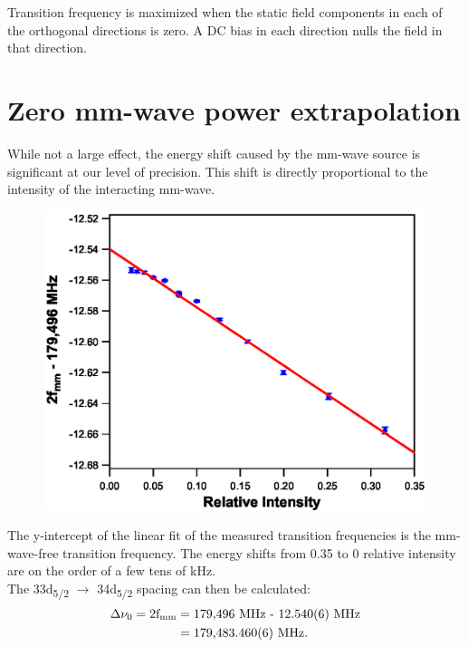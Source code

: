 \documentclass[landscape]{sciposter}
\begin{document}
\begin{multicols}{4}
Transition frequency is maximized when the static field components in each of the orthogonal directions is zero. A DC bias in each direction nulls the field in that direction. 

\section*{\large Zero mm-wave power extrapolation}
While not a large effect, the energy shift caused by the mm-wave source is significant at our level of precision. This shift is directly proportional to the intensity of the interacting mm-wave. 

\begin{figure}
\begin{center}
\includegraphics[scale = 0.9]{pscans52.eps}
\caption{}
\label{Power}
\end{center}
\end{figure}

The y-intercept of the linear fit of the measured transition frequencies is the mm-wave-free transition frequency. The energy shifts from 0.35 to 0 relative intensity are on the order of a few tens of kHz.\\

The 33d\textsubscript{5/2} $\rightarrow$ 34d\textsubscript{5/2} spacing can then be calculated:
\begin{align*}
\Delta \nu_0 = \textrm{2f\textsubscript{mm}} &= \textrm{179,496 MHz - 12.540(6) MHz} \\ &= \textrm{179,483.460(6) MHz}.
\end{align*}




\end{multicols}
\end{document}

